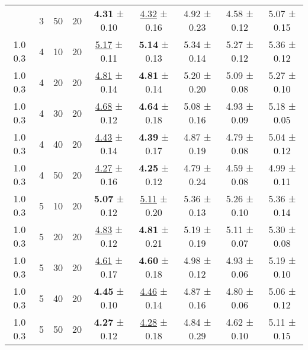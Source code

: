 \begin{tabular}{ccccccccc}
\begin{tabular}{lllllllll}
1.0 0.3 & 3 & 50 & 20 &    \textbf{4.31} ± 0.10 & \underline{4.32} ± 0.16 & 4.92 ± 0.23 & 4.58 ± 0.12 & 5.07 ± 0.15 \\
1.0 0.3 & 4 & 10 & 20 & \underline{5.17} ± 0.11 &    \textbf{5.14} ± 0.13 & 5.34 ± 0.14 & 5.27 ± 0.12 & 5.36 ± 0.12 \\
1.0 0.3 & 4 & 20 & 20 & \underline{4.81} ± 0.14 &    \textbf{4.81} ± 0.14 & 5.20 ± 0.20 & 5.09 ± 0.08 & 5.27 ± 0.10 \\
1.0 0.3 & 4 & 30 & 20 & \underline{4.68} ± 0.12 &    \textbf{4.64} ± 0.18 & 5.08 ± 0.16 & 4.93 ± 0.09 & 5.18 ± 0.05 \\
1.0 0.3 & 4 & 40 & 20 & \underline{4.43} ± 0.14 &    \textbf{4.39} ± 0.17 & 4.87 ± 0.19 & 4.79 ± 0.08 & 5.04 ± 0.12 \\
1.0 0.3 & 4 & 50 & 20 & \underline{4.27} ± 0.16 &    \textbf{4.25} ± 0.12 & 4.79 ± 0.24 & 4.59 ± 0.08 & 4.99 ± 0.11 \\
1.0 0.3 & 5 & 10 & 20 &    \textbf{5.07} ± 0.12 & \underline{5.11} ± 0.20 & 5.36 ± 0.13 & 5.26 ± 0.10 & 5.36 ± 0.14 \\
1.0 0.3 & 5 & 20 & 20 & \underline{4.83} ± 0.12 &    \textbf{4.81} ± 0.21 & 5.19 ± 0.19 & 5.11 ± 0.07 & 5.30 ± 0.08 \\
1.0 0.3 & 5 & 30 & 20 & \underline{4.61} ± 0.17 &    \textbf{4.60} ± 0.18 & 4.98 ± 0.12 & 4.93 ± 0.06 & 5.19 ± 0.10 \\
1.0 0.3 & 5 & 40 & 20 &    \textbf{4.45} ± 0.10 & \underline{4.46} ± 0.14 & 4.87 ± 0.16 & 4.80 ± 0.06 & 5.06 ± 0.12 \\
1.0 0.3 & 5 & 50 & 20 &    \textbf{4.27} ± 0.12 & \underline{4.28} ± 0.18 & 4.84 ± 0.29 & 4.62 ± 0.10 & 5.11 ± 0.15 \\
\bottomrule
\end{tabular}
